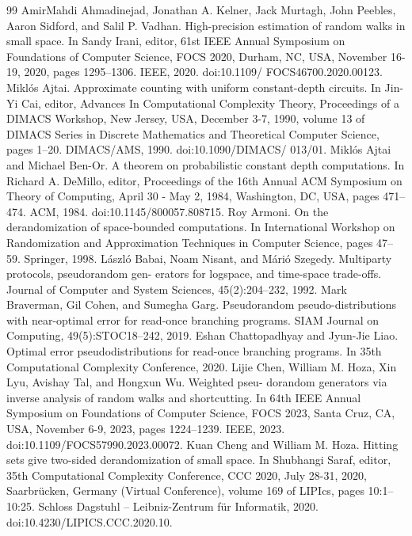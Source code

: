 \begin{thebibliography}{99}
 AmirMahdi Ahmadinejad, Jonathan A. Kelner, Jack Murtagh, John Peebles, Aaron Sidford, and Salil P. Vadhan. High-precision estimation of random walks in small space. In Sandy Irani, editor, 61st IEEE Annual Symposium on Foundations of Computer Science, FOCS 2020, Durham, NC, USA, November 16-19, 2020, pages 1295–1306. IEEE, 2020. doi:10.1109/ FOCS46700.2020.00123.
 Miklós Ajtai. Approximate counting with uniform constant-depth circuits. In Jin-Yi Cai, editor, Advances In Computational Complexity Theory, Proceedings of a DIMACS Workshop, New Jersey, USA, December 3-7, 1990, volume 13 of DIMACS Series in Discrete Mathematics and Theoretical Computer Science, pages 1–20. DIMACS/AMS, 1990. doi:10.1090/DIMACS/ 013/01.
 Miklós Ajtai and Michael Ben-Or. A theorem on probabilistic constant depth computations. In Richard A. DeMillo, editor, Proceedings of the 16th Annual ACM Symposium on Theory of Computing, April 30 - May 2, 1984, Washington, DC, USA, pages 471–474. ACM, 1984. doi:10.1145/800057.808715.
 Roy Armoni. On the derandomization of space-bounded computations. In International Workshop on Randomization and Approximation Techniques in Computer Science, pages 47–59. Springer, 1998.
 László Babai, Noam Nisant, and Márió Szegedy. Multiparty protocols, pseudorandom gen- erators for logspace, and time-space trade-offs. Journal of Computer and System Sciences, 45(2):204–232, 1992.
 Mark Braverman, Gil Cohen, and Sumegha Garg. Pseudorandom pseudo-distributions with near-optimal error for read-once branching programs. SIAM Journal on Computing, 49(5):STOC18–242, 2019.
 Eshan Chattopadhyay and Jyun-Jie Liao. Optimal error pseudodistributions for read-once branching programs. In 35th Computational Complexity Conference, 2020.
 Lijie Chen, William M. Hoza, Xin Lyu, Avishay Tal, and Hongxun Wu. Weighted pseu- dorandom generators via inverse analysis of random walks and shortcutting. In 64th IEEE Annual Symposium on Foundations of Computer Science, FOCS 2023, Santa Cruz, CA, USA, November 6-9, 2023, pages 1224–1239. IEEE, 2023. doi:10.1109/FOCS57990.2023.00072.
 Kuan Cheng and William M. Hoza. Hitting sets give two-sided derandomization of small space. In Shubhangi Saraf, editor, 35th Computational Complexity Conference, CCC 2020, July 28-31, 2020, Saarbrücken, Germany (Virtual Conference), volume 169 of LIPIcs, pages 10:1–10:25. Schloss Dagstuhl – Leibniz-Zentrum für Informatik, 2020. doi:10.4230/LIPICS.CCC.2020.10.

\end{thebibliography}
